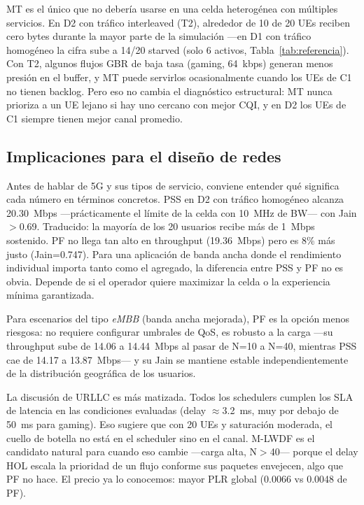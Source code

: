 \documentclass[conference]{IEEEtran}
\begin{document}
MT es el único que no debería usarse en una celda heterogénea con múltiples servicios.
En D2 con tráfico interleaved (T2), alrededor de 10 de 20 UEs reciben cero bytes
durante la mayor parte de la simulación ---en D1 con tráfico homogéneo la cifra
sube a 14/20 starved (solo 6 activos, Tabla~\ref{tab:referencia}). Con T2, algunos
flujos GBR de baja tasa (gaming, 64~kbps) generan menos presión en el buffer, y MT
puede servirlos ocasionalmente cuando los UEs de C1 no tienen backlog. Pero eso no
cambia el diagnóstico estructural: MT nunca prioriza a un UE lejano si hay uno cercano
con mejor CQI, y en D2 los UEs de C1 siempre tienen mejor canal promedio.

\subsection{Implicaciones para el diseño de redes}

Antes de hablar de 5G y sus tipos de servicio, conviene entender qué significa
cada número en términos concretos. PSS en D2 con tráfico homogéneo alcanza
20.30~Mbps ---prácticamente el límite de la celda con 10~MHz de BW--- con Jain$>$0.69.
Traducido: la mayoría de los 20 usuarios recibe más de 1~Mbps sostenido. PF no llega
tan alto en throughput (19.36~Mbps) pero es 8\% más justo (Jain=0.747). Para una
aplicación de banda ancha donde el rendimiento individual importa tanto como el
agregado, la diferencia entre PSS y PF no es obvia. Depende de si el operador
quiere maximizar la celda o la experiencia mínima garantizada.

Para escenarios del tipo \emph{eMBB} (banda ancha mejorada), PF es la opción
menos riesgosa: no requiere configurar umbrales de QoS, es robusto a la carga
---su throughput sube de 14.06 a 14.44~Mbps al pasar de N=10 a N=40, mientras
PSS cae de 14.17 a 13.87~Mbps--- y su Jain se mantiene estable independientemente
de la distribución geográfica de los usuarios.

La discusión de URLLC es más matizada. Todos los schedulers cumplen los SLA de
latencia en las condiciones evaluadas (delay $\approx$3.2~ms, muy por debajo de
50~ms para gaming). Eso sugiere que con 20 UEs y saturación moderada, el
cuello de botella no está en el scheduler sino en el canal. M-LWDF es el candidato
natural para cuando eso cambie ---carga alta, N$>$40--- porque el delay HOL escala
la prioridad de un flujo conforme sus paquetes envejecen, algo que PF no hace.
El precio ya lo conocemos: mayor PLR global (0.0066 vs 0.0048 de PF).
\end{document}
